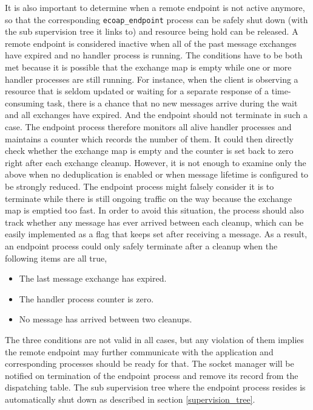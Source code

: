 It is also important to determine when a remote endpoint is not active anymore, so that the corresponding \verb|ecoap_endpoint| process can be safely shut down (with the sub supervision tree it links to) and resource being hold can be released. A remote endpoint is considered inactive when all of the past message exchanges have expired and no handler process is running. The conditions have to be both met because it is possible that the exchange map is empty while one or more handler processes are still running. For instance, when the client is observing a resource that is seldom updated or waiting for a separate response of a time-consuming task, there is a chance that no new messages arrive during the wait and all exchanges have expired. And the endpoint should not terminate in such a case. The endpoint process therefore monitors all alive handler processes and maintains a counter which records the number of them. It could then directly check whether the exchange map is empty and the counter is set back to zero right after each exchange cleanup. However, it is not enough to examine only the above when no deduplication is enabled or when message lifetime is configured to be strongly reduced. The endpoint process might falsely consider it is to terminate while there is still ongoing traffic on the way because the exchange map is emptied too fast. In order to avoid this situation, the process should also track whether any message has ever arrived between each cleanup, which can be easily implemented as a flag that keeps set after receiving a message. As a result, an endpoint process could only safely terminate after a cleanup when the following items are all true,

\begin{itemize}

\item The last message exchange has expired.
\item The handler process counter is zero.
\item No message has arrived between two cleanups. 

\end{itemize}

The three conditions are not valid in all cases, but any violation of them implies the remote endpoint may further communicate with the application and corresponding processes should be ready for that. The socket manager will be notified on termination of the endpoint process and remove its record from the dispatching table. The sub supervision tree where the endpoint process resides is automatically shut down as described in section \ref{supervision_tree}. 

